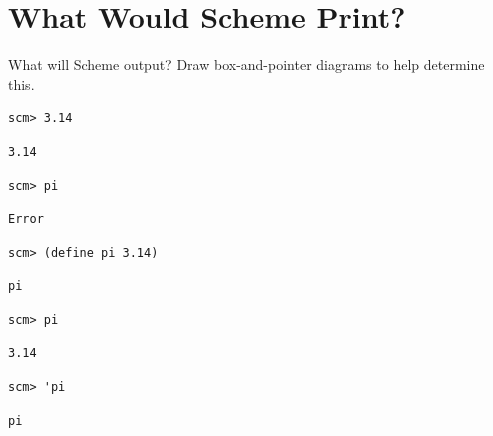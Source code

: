 \documentclass{exam}
\begin{document}
\section{What Would Scheme Print?}
\begin{questions}
\begin{blocksection}
\question What will Scheme output? Draw box-and-pointer diagrams to help determine this.

\begin{lstlisting}
scm> 3.14
\end{lstlisting}
\begin{solution}[0.25in]
\begin{lstlisting}
3.14
\end{lstlisting}
\end{solution}

\begin{lstlisting}
scm> pi
\end{lstlisting}
\begin{solution}[0.25in]
\begin{lstlisting}
Error
\end{lstlisting}
\end{solution}

\begin{lstlisting}
scm> (define pi 3.14)
\end{lstlisting}
\begin{solution}[0.25in]
\begin{lstlisting}
pi
\end{lstlisting}
\end{solution}

\begin{lstlisting}
scm> pi
\end{lstlisting}
\begin{solution}[.25in]
\begin{lstlisting}
3.14
\end{lstlisting}
\end{solution}
\end{blocksection}

\begin{blocksection}
\begin{lstlisting}
scm> 'pi
\end{lstlisting}
\begin{solution}[.25in]
\begin{lstlisting}
pi
\end{lstlisting}
\end{solution}


\end{blocksection}
\end{questions}
\end{document}
